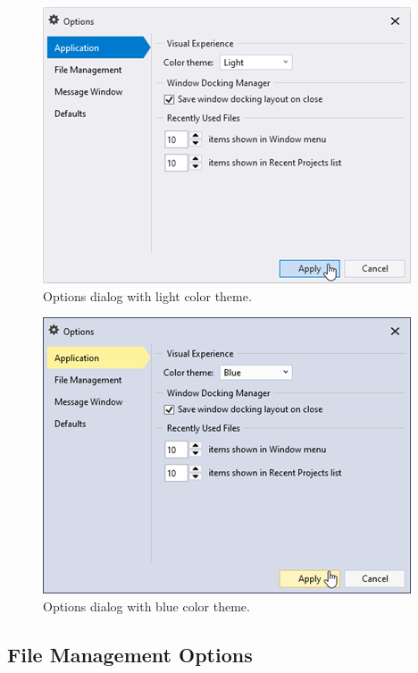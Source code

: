 \documentclass[
]{book}
\begin{document}
\begin{figure}

{\centering \includegraphics{images/figure32} 

}

\caption{Options dialog with light color theme.}\label{fig:figure-32}
\end{figure}

\begin{figure}

{\centering \includegraphics{images/figure33} 

}

\caption{Options dialog with blue color theme.}\label{fig:figure-33}
\end{figure}

\hypertarget{file-management-options}{%
\subsection{File Management Options}\label{file-management-options}}
\end{document}
